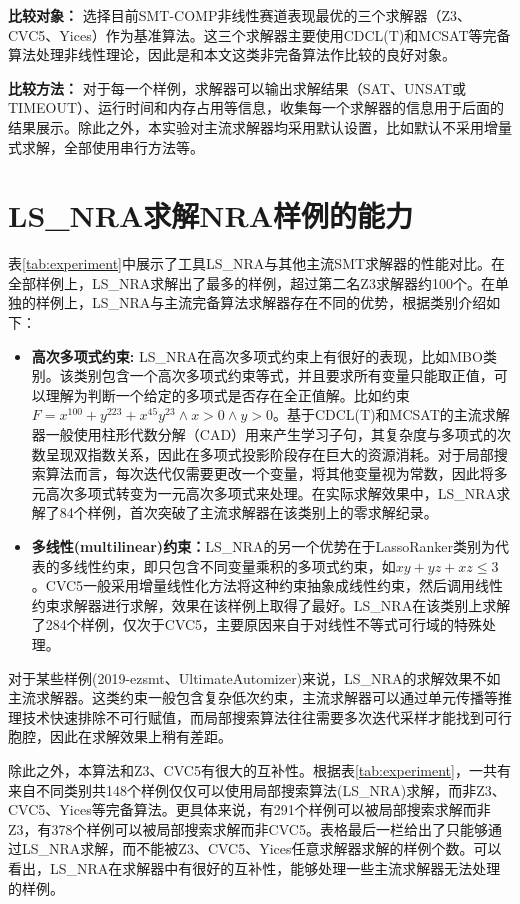  \textbf{比较对象：} 选择目前SMT-COMP非线性赛道表现最优的三个求解器（Z3\cite{MouraB08}、CVC5\cite{BarbosaBBKLMMMN22}、Yices\cite{Dutertre14}）作为基准算法。这三个求解器主要使用CDCL(T)和MCSAT等完备算法处理非线性理论，因此是和本文这类非完备算法作比较的良好对象。

\textbf{比较方法：} 对于每一个样例，求解器可以输出求解结果（SAT、UNSAT或TIMEOUT）、运行时间和内存占用等信息，收集每一个求解器的信息用于后面的结果展示。除此之外，本实验对主流求解器均采用默认设置，比如默认不采用增量式求解，全部使用串行方法等。

\section{LS\_NRA求解NRA样例的能力}
表\ref{tab:experiment}中展示了工具LS\_NRA与其他主流SMT求解器的性能对比。在全部样例上，LS\_NRA求解出了最多的样例，超过第二名Z3求解器约100个。在单独的样例上，LS\_NRA与主流完备算法求解器存在不同的优势，根据类别介绍如下：
\begin{itemize}
    \item \textbf{高次多项式约束:} 
    LS\_NRA在高次多项式约束上有很好的表现，比如MBO类别。该类别包含一个高次多项式约束等式，并且要求所有变量只能取正值，可以理解为判断一个给定的多项式是否存在全正值解。比如约束$F = x^{100} + y^{223} + x^{45} y^{23} \wedge x > 0 \wedge y > 0$。基于CDCL(T)和MCSAT的主流求解器一般使用柱形代数分解（CAD）用来产生学习子句，其复杂度与多项式的次数呈现双指数关系，因此在多项式投影阶段存在巨大的资源消耗。对于局部搜索算法而言，每次迭代仅需要更改一个变量，将其他变量视为常数，因此将多元高次多项式转变为一元高次多项式来处理。在实际求解效果中，LS\_NRA求解了84个样例，首次突破了主流求解器在该类别上的零求解纪录。

    \item \textbf{多线性(multilinear)约束：}LS\_NRA的另一个优势在于LassoRanker类别为代表的多线性约束，即只包含不同变量乘积的多项式约束，如$x y + y z + x z \leq 3$。CVC5一般采用增量线性化方法将这种约束抽象成线性约束，然后调用线性约束求解器进行求解，效果在该样例上取得了最好。LS\_NRA在该类别上求解了284个样例，仅次于CVC5，主要原因来自于对线性不等式可行域的特殊处理。
\end{itemize}

对于某些样例(2019-ezsmt、UltimateAutomizer)来说，LS\_NRA的求解效果不如主流求解器。这类约束一般包含复杂低次约束，主流求解器可以通过单元传播等推理技术快速排除不可行赋值，而局部搜索算法往往需要多次迭代采样才能找到可行胞腔，因此在求解效果上稍有差距。

除此之外，本算法和Z3、CVC5有很大的互补性。根据表\ref{tab:experiment}，一共有来自不同类别共148个样例仅仅可以使用局部搜索算法(LS\_NRA)求解，而非Z3、CVC5、Yices等完备算法。更具体来说，有291个样例可以被局部搜索求解而非Z3，有378个样例可以被局部搜索求解而非CVC5。表格最后一栏给出了只能够通过LS\_NRA求解，而不能被Z3、CVC5、Yices任意求解器求解的样例个数。可以看出，LS\_NRA在求解器中有很好的互补性，能够处理一些主流求解器无法处理的样例。

